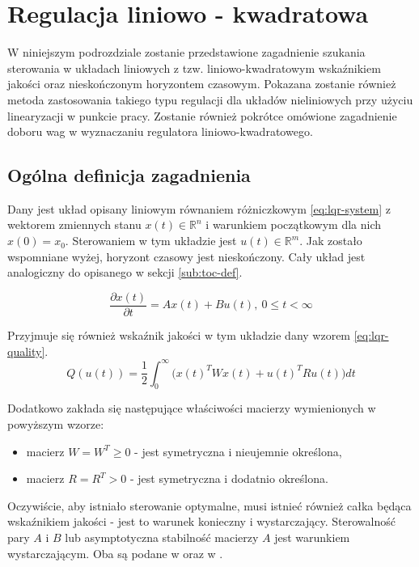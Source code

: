 \section{Regulacja liniowo - kwadratowa}
\label{sec:lqr}

W niniejszym podrozdziale zostanie przedstawione zagadnienie szukania sterowania w układach liniowych z tzw. liniowo-kwadratowym wskaźnikiem jakości oraz nieskończonym horyzontem czasowym. Pokazana zostanie również metoda zastosowania takiego typu regulacji dla układów nieliniowych przy użyciu linearyzacji w punkcie pracy. Zostanie również pokrótce omówione zagadnienie doboru wag w wyznaczaniu regulatora liniowo-kwadratowego.

\subsection{Ogólna definicja zagadnienia}
\label{sub:lqr-def}

Dany jest układ opisany liniowym równaniem różniczkowym \ref{eq:lqr-system} z wektorem zmiennych stanu $x(t) \in \mathbb{R}^{n}$ i warunkiem początkowym dla nich $x(0) = x_{0}$. Sterowaniem w tym układzie jest $u(t) \in \mathbb{R}^{m}$. Jak zostało wspomniane wyżej, horyzont czasowy jest nieskończony. Cały układ jest analogiczny do opisanego w sekcji \ref{sub:toc-def}.

\begin{equation}\label{eq:lqr-system}
\frac{\partial x(t)}{\partial t} = Ax(t) + Bu(t),~ 0 \leq t < \infty
\end{equation}

Przyjmuje się również wskaźnik jakości w tym układzie dany wzorem \ref{eq:lqr-quality}.
\begin{equation}\label{eq:lqr-quality}
Q(u(t)) = \frac{1}{2}\int_{0}^{\infty} \Big(x(t)^{T}Wx(t) + u(t)^{T}Ru(t)\Big)dt
\end{equation}

Dodatkowo zakłada się następujące właściwości macierzy wymienionych w powyższym wzorze:
\begin{itemize}
    \item macierz $W = W^{T} \geq 0$ - jest symetryczna i nieujemnie określona,
    \item macierz $R = R^{T} > 0$ - jest symetryczna i dodatnio określona.
\end{itemize}

Oczywiście, aby istniało sterowanie optymalne, musi istnieć również całka będąca wskaźnikiem jakości - jest to warunek konieczny i wystarczający. Sterowalność pary $A$ i $B$ lub asymptotyczna stabilność macierzy $A$ jest warunkiem wystarczającym. Oba są podane w \cite{Korytowski2015} oraz w \cite{AthansOptCtrl}.

